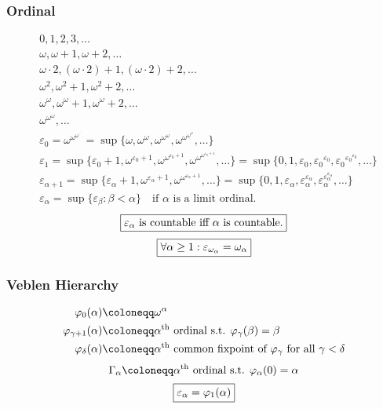 \documentclass[UTF8,aspectratio=43,11pt,colorlinks,compress,openany]{beamer}%
\begin{document}
\begin{frame}\frametitle{Ordinal}\vspace{-3ex}
\begin{align*}
			&0, 1, 2, 3,\dots\\
			&\omega, \omega+1, \omega+2,\dots\\
			&\omega\cdot 2, (\omega \cdot 2)+1, (\omega \cdot 2)+2,\dots\\
			&\omega^2, \omega^2+1, \omega^2+2,\dots\\
			&\omega^{\omega}, \omega^{\omega}+1, \omega^{\omega}+2,\dots\\
			&\omega^{\omega^{\omega}},\dots\\
			&\varepsilon_0=\omega^{\omega^{\omega^{\cdot^{\cdot^{\cdot}}}}}=\sup\{\omega,\omega^{\omega},\omega^{\omega^{\omega}},\omega^{\omega^{\omega^{\omega}}},\dots\}\\
			&\varepsilon_1=\sup\{\varepsilon_0+1,\omega^{\varepsilon_0+1},\omega^{\omega^{\varepsilon_0+1}},\omega^{\omega^{\omega^{\varepsilon_0+1}}},\dots\}=\sup\{0,1,\varepsilon_0,{\varepsilon_0}^{\varepsilon_0},{\varepsilon_0}^{{\varepsilon_0}^{\varepsilon_0}},\ldots\}\\
			&\varepsilon_{\alpha+1}=\sup\{\varepsilon_{\alpha }+1,\omega^{\varepsilon_{\alpha }+1},\omega ^{\omega^{\varepsilon_{\alpha }+1}},\dots \}=\sup\{0,1,\varepsilon_{\alpha },\varepsilon_{\alpha }^{\varepsilon_{\alpha }},\varepsilon_{\alpha }^{\varepsilon_{\alpha }^{\varepsilon_{\alpha }}},\dots\}\\
			&\varepsilon_\alpha=\sup\{\varepsilon _{\beta}:\beta<\alpha\}\quad\mbox{if $\alpha$ is a limit ordinal.}
			\end{align*}
			\[\fbox{$\varepsilon_\alpha$ is countable iff $\alpha$ is countable.}\]
			\[\fbox{$\forall \alpha \geq 1:\varepsilon_{\omega_\alpha}=\omega_\alpha$}\]
\end{frame}

\begin{frame}\frametitle{Veblen Hierarchy}
\begin{align*}
\varphi_0(\alpha)&\coloneqq \omega^\alpha\\
\varphi_{\gamma+1}(\alpha)&\coloneqq \alpha\textsuperscript{th} \mbox{ ordinal s.t. } \varphi_\gamma(\beta)=\beta\\
\varphi_\delta(\alpha)&\coloneqq \alpha\textsuperscript{th} \mbox{ common fixpoint of $\varphi_\gamma$ for all } \gamma<\delta
\end{align*}
\[\Gamma_\alpha\coloneqq \alpha\textsuperscript{th} \mbox{ ordinal s.t. } \varphi_\alpha(0)=\alpha\]
\[\fbox{$\varepsilon_\alpha=\varphi_1(\alpha)$}\]
\end{frame}
\end{document}
